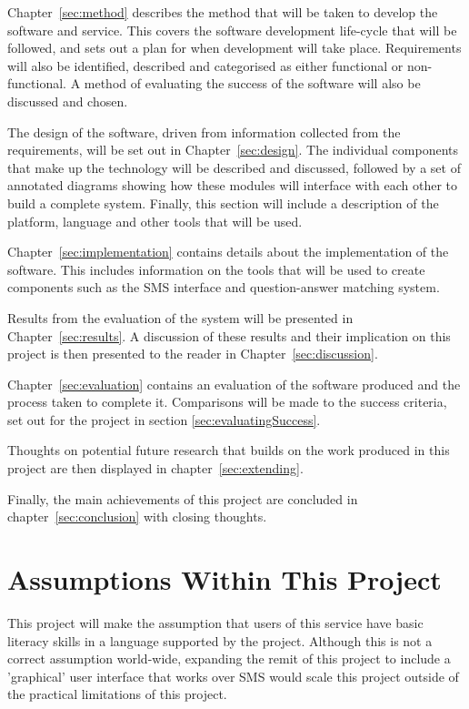 \documentclass[authoryearcitations]{UoYCSproject}
\begin{document}
Chapter~\ref{sec:method} describes the method that will be taken to develop the software and service.  This covers the software development life-cycle that will be followed, and sets out a plan for when development will take place.  Requirements will also be identified, described and categorised  as either functional or non-functional.  A method of evaluating the success of the software will also be discussed and chosen.

The design of the software, driven from information collected from the requirements, will be set out in Chapter~\ref{sec:design}.  The individual components that make up the technology will be described and discussed, followed by a set of annotated diagrams showing how these modules will interface with each other to build a complete system.  Finally, this section will include a description of the platform, language and other tools that will be used.

Chapter~\ref{sec:implementation} contains details about the implementation of the software.  This includes information on the tools that will be used to create components such as the SMS interface and question-answer matching system.

Results from the evaluation of the system will be presented in Chapter~\ref{sec:results}.  A discussion of these results and their implication on this project is then presented to the reader in Chapter~\ref{sec:discussion}.

Chapter~\ref{sec:evaluation} contains an evaluation of the software produced and the process taken to complete it.  Comparisons will be made to the success criteria, set out for the project in section \ref{sec:evaluatingSuccess}.

Thoughts on potential future research that builds on the work produced in this project are then displayed in chapter~\ref{sec:extending}.

Finally, the main achievements of this project are concluded in chapter~\ref{sec:conclusion} with closing thoughts.


\section{Assumptions Within This Project}
This project will make the assumption that users of this service have basic literacy skills in a language supported by the project.  Although this is not a correct assumption world-wide, expanding the remit of this project to include a 'graphical' user interface that works over SMS would scale this project outside of the practical limitations of this project.
\end{document}
